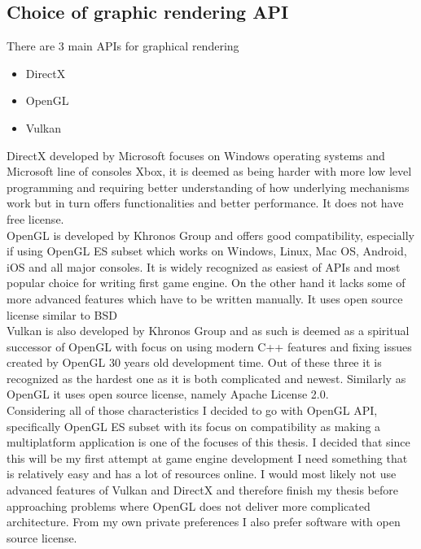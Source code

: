 \documentclass[12pt]{article}
\begin{document}
\subsection{Choice of graphic rendering API }
There are 3 main APIs for graphical rendering
\begin{itemize}
    \item DirectX
    \item OpenGL 
    \item Vulkan
\end{itemize}
DirectX developed by Microsoft focuses on Windows operating systems and 
Microsoft line of consoles Xbox, it is deemed as being harder with more 
low level programming and requiring better understanding of how underlying
mechanisms work but in turn offers functionalities and better performance. 
It does not have free license. \\
OpenGL is developed by Khronos Group and offers good compatibility, 
especially if using OpenGL ES subset which works on Windows, Linux, 
Mac OS, Android, iOS and all major consoles. 
It is widely recognized as easiest of APIs and most popular choice 
for writing first game engine. On the other hand it lacks some of 
more advanced features which have to be written manually. 
It uses open source license similar to BSD
\\
Vulkan is also developed by Khronos Group and as such is deemed as a 
spiritual successor of OpenGL with focus on using modern C++ features and 
fixing issues created by OpenGL 30 years old development time. 
Out of these three it is recognized as the hardest one as 
it is both complicated and newest. Similarly as OpenGL 
it uses open source license, namely Apache License 2.0. 
\\
Considering all of those characteristics I decided to go with OpenGL API, 
specifically OpenGL ES subset with its focus on compatibility as 
making a multiplatform application is one of the focuses of this thesis.
I decided that since this will be my first attempt at game engine development 
I need something that is relatively easy and has a lot of resources online.
I would most likely not use advanced features of Vulkan and DirectX and 
therefore finish my thesis before approaching problems where OpenGL 
does not deliver more complicated architecture. 
From my own private preferences I also prefer software with 
open source license.
\end{document}
